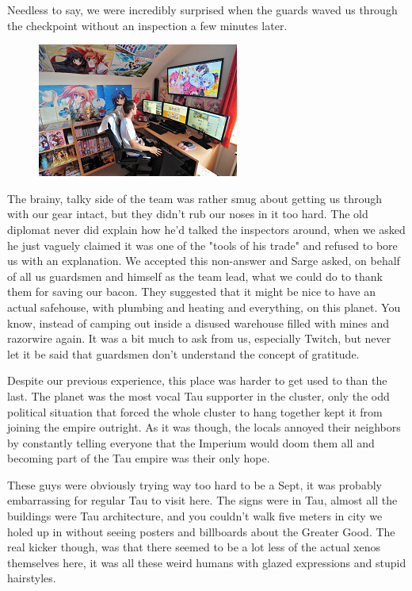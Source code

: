 Needless to say, we were incredibly surprised when the guards waved us through the checkpoint without an inspection a few minutes later.

\begin{figure}
	\begin{center}
		\includegraphics[width=\figwidth]{pics/10/36.png}
	\end{center}
\end{figure}
The brainy, talky side of the team was rather smug about getting us through with our gear intact, but they didn't rub our noses in it too hard. 
The old diplomat never did explain how he'd talked the inspectors around, when we asked he just vaguely claimed it was one of the "tools of his trade" and refused to bore us with an explanation. 
We accepted this non-answer and Sarge asked, on behalf of all us guardsmen and himself as the team lead, what we could do to thank them for saving our bacon. 
They suggested that it might be nice to have an actual safehouse, with plumbing and heating and everything, on this planet. 
You know, instead of camping out inside a disused warehouse filled with mines and razorwire again. 
It was a bit much to ask from us, especially Twitch, but never let it be said that guardsmen don't understand the concept of gratitude.

Despite our previous experience, this place was harder to get used to than the last. 
The planet was the most vocal Tau supporter in the cluster, only the odd political situation that forced the whole cluster to hang together kept it from joining the empire outright. 
As it was though, the locals annoyed their neighbors by constantly telling everyone that the Imperium would doom them all and becoming part of the Tau empire was their only hope. 


These guys were obviously trying way too hard to be a Sept, it was probably embarrassing for regular Tau to visit here. 
The signs were in Tau, almost all the buildings were Tau architecture, and you couldn't walk five meters in city we holed up in without seeing posters and billboards about the Greater Good. 
The real kicker though, was that there seemed to be a lot less of the actual xenos themselves here, it was all these weird humans with glazed expressions and stupid hairstyles. 


